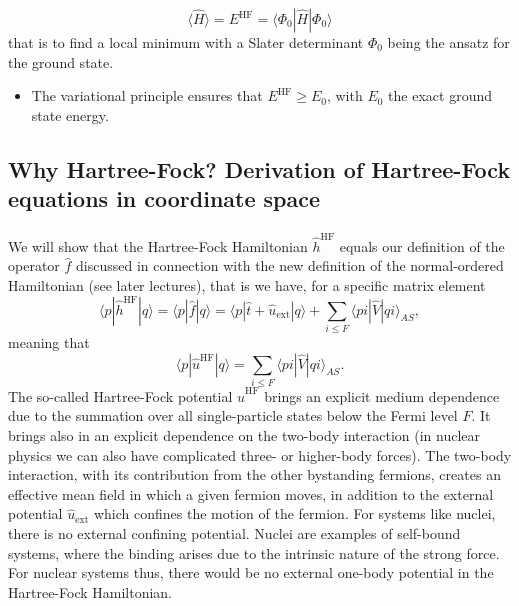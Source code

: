 \documentclass[%
twoside,                 %
final,                   %
10pt]{article}
\begin{document}
\noindent
\[ \langle \hat{H} \rangle = E^{\mathrm{HF}}= \langle \Phi_0 | \hat{H}|\Phi_0 \rangle
\]
that is to find a local minimum with a Slater determinant $\Phi_0$ being the ansatz for the ground state. 
\begin{itemize}
  \item The variational principle ensures that $E^{\mathrm{HF}} \ge E_0$, with $E_0$ the exact ground state energy.
\end{itemize}

\noindent




\subsection*{Why Hartree-Fock? Derivation of Hartree-Fock equations in coordinate space}

\paragraph{}
We will show that the Hartree-Fock Hamiltonian $\hat{h}^{\mathrm{HF}}$ equals our definition of the operator $\hat{f}$ discussed in connection with the new definition of the normal-ordered Hamiltonian (see later lectures), that is we have, for a specific matrix element
\[
\langle p |\hat{h}^{\mathrm{HF}}| q \rangle =\langle p |\hat{f}| q \rangle=\langle p|\hat{t}+\hat{u}_{\mathrm{ext}}|q \rangle +\sum_{i\le F} \langle pi | \hat{V} | qi\rangle_{AS},
\]
meaning that
\[
\langle p|\hat{u}^{\mathrm{HF}}|q\rangle = \sum_{i\le F} \langle pi | \hat{V} | qi\rangle_{AS}.
\]
The so-called Hartree-Fock potential $\hat{u}^{\mathrm{HF}}$ brings an explicit medium dependence due to the summation over all single-particle states below the Fermi level $F$. It brings also in an explicit dependence on the two-body interaction (in nuclear physics we can also have complicated three- or higher-body forces). The two-body interaction, with its contribution from the other bystanding fermions, creates an effective mean field in which a given fermion moves, in addition to the external potential $\hat{u}_{\mathrm{ext}}$ which confines the motion of the fermion. For systems like nuclei, there is no external confining potential. Nuclei are examples of self-bound systems, where the binding arises due to the intrinsic nature of the strong force. For nuclear systems thus, there would be no external one-body potential in the Hartree-Fock Hamiltonian.
\end{document}
